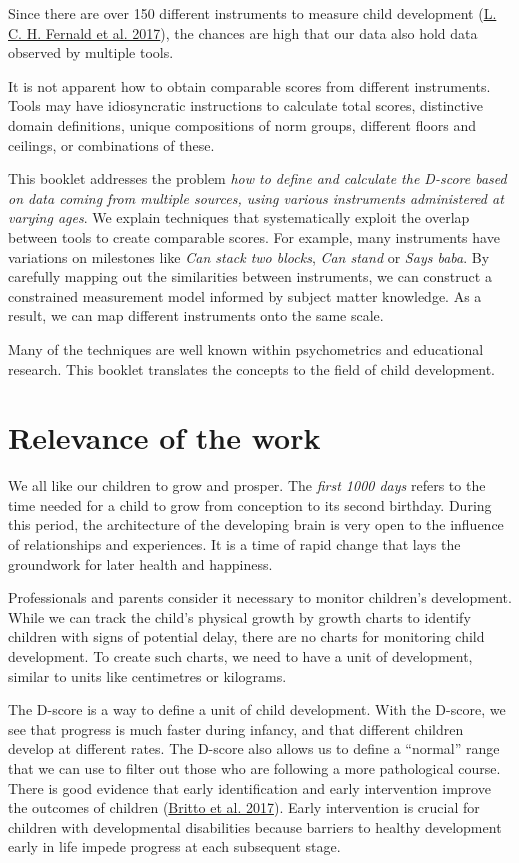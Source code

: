 \documentclass[
]{book}
\begin{document}
Since there are over 150 different instruments to measure child development (\protect\hyperlink{ref-fernald2017toolkit}{L. C. H. Fernald et al. 2017}), the chances are high that our data also hold data observed by multiple tools.

It is not apparent how to obtain comparable scores from different instruments. Tools may have idiosyncratic instructions to calculate total scores, distinctive domain definitions, unique compositions of norm groups, different floors and ceilings, or combinations of these.

This booklet addresses the problem \emph{how to define and calculate the D-score based on data coming from multiple sources, using various instruments administered at varying ages}. We explain techniques that systematically exploit the overlap between tools to create comparable scores. For example, many instruments have variations on milestones like \emph{Can stack two blocks}, \emph{Can stand} or \emph{Says baba}. By carefully mapping out the similarities between instruments, we can construct a constrained measurement model informed by subject matter knowledge. As a result, we can map different instruments onto the same scale.

Many of the techniques are well known within psychometrics and educational research. This booklet translates the concepts to the field of child development.

\hypertarget{sec:relevance}{%
\section{Relevance of the work}\label{sec:relevance}}

We all like our children to grow and prosper. The \emph{first 1000 days} refers to the time needed for a child to grow from conception to its second birthday. During this period, the architecture of the developing brain is very open to the influence of relationships and experiences. It is a time of rapid change that lays the groundwork for later health and happiness.

Professionals and parents consider it necessary to monitor children's development. While we can track the child's physical growth by growth charts to identify children with signs of potential delay, there are no charts for monitoring child development. To create such charts, we need to have a unit of development, similar to units like centimetres or kilograms.

The D-score is a way to define a unit of child development. With the D-score, we see that progress is much faster during infancy, and that different children develop at different rates. The D-score also allows us to define a ``normal'' range that we can use to filter out those who are following a more pathological course. There is good evidence that early identification and early intervention improve the outcomes of children (\protect\hyperlink{ref-britto2017}{Britto et al. 2017}). Early intervention is crucial for children with developmental disabilities because barriers to healthy development early in life impede progress at each subsequent stage.
\end{document}
